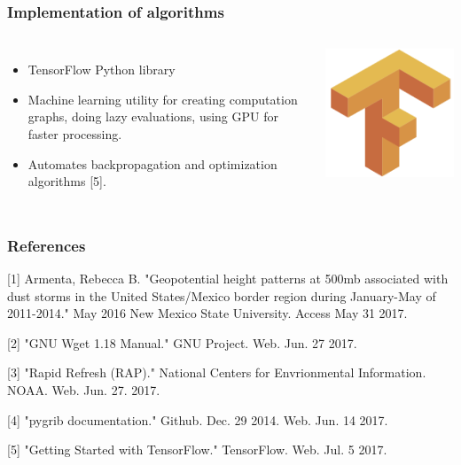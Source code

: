 \documentclass{beamer}
\begin{document}
\begin{frame}
	\frametitle{Implementation of algorithms}
	\begin{columns}
		\begin{itemize}
			\item
				TensorFlow Python library
			\item
				Machine learning utility for creating computation graphs, doing lazy evaluations, using GPU for faster processing.
			\item
				Automates backpropagation and optimization algorithms [5].
		\end{itemize}
		\includegraphics[width=\textwidth]{images/tensorflow.png}
	\end{columns}
\end{frame}

\begin{frame}
	\frametitle{References}
	[1] Armenta, Rebecca B. "Geopotential height patterns at 500mb associated with dust storms in the United States/Mexico border region during January-May of 2011-2014." May 2016 New Mexico State University.  Access May 31 2017.

	[2] "GNU Wget 1.18 Manual." GNU Project. Web. Jun. 27 2017.

	[3] "Rapid Refresh (RAP)." National Centers for Envrionmental Information. NOAA. Web. Jun. 27. 2017.

	[4] "pygrib documentation." Github. Dec. 29 2014. Web. Jun. 14 2017.

	[5] "Getting Started with TensorFlow." TensorFlow. Web. Jul. 5 2017.

\end{frame}
\end{document}
